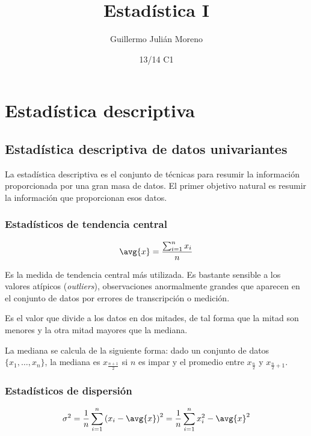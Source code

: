 \documentclass{apuntes}
\author{Guillermo Julián Moreno}
\date{13/14 C1}
\title{Estadística I}
\begin{document}
\pagestyle{plain}
\maketitle

\tableofcontents
\newpage

\chapter{Estadística descriptiva}
\section{Estadística descriptiva de datos univariantes}

La estadística descriptiva es el conjunto de técnicas para resumir la información proporcionada por una gran masa de datos. El primer objetivo natural es resumir la información que proporcionan esos datos.

\subsection{Estadísticos de tendencia central}
 
\begin{defn}[Media]

\[ \avg{x} = \frac{\sum_{i=1}^n x_i}{n} \]

Es la medida de tendencia central más utilizada. Es bastante sensible a los valores atípicos (\textit{outliers}), observaciones anormalmente grandes que aparecen en el conjunto de datos por errores de transcripción o medición.

\end{defn}

\begin{defn}[Mediana]
Es el valor que divide a los datos en dos mitades, de tal forma que la mitad son menores y la otra mitad mayores que la mediana. 

La mediana se calcula de la siguiente forma: dado un conjunto de datos $\{x_1,\dotsc, x_n\}$, la mediana es $x_{\frac{n+1}{2}}$ si $n$ es impar y  el promedio entre $x_{\frac{n}{2}}$ y $x_{\frac{n}{2} + 1}$.
\end{defn} 

\subsection{Estadísticos de dispersión}

\begin{defn}[Varianza]
\[ \sigma^2 = \frac{1}{n} \sum_{i=1}^n \left(x_i - \avg{x}\right)^2 = \frac{1}{n} \sum_{i=1}^n x_i^2 - \avg{x}^2 \]
\end{defn}
\end{document}
